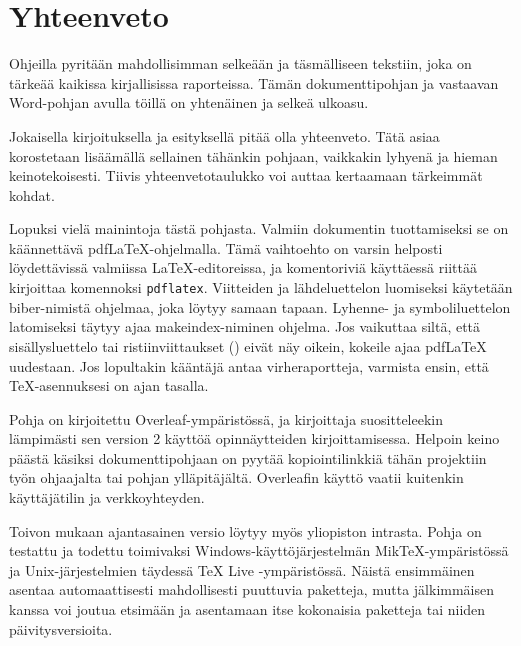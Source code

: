 \chapter{Yhteenveto}
\label{ch:yhteenveto}

Ohjeilla pyritään mahdollisimman selkeään ja täsmälliseen tekstiin, joka on tärkeää kaikissa kirjallisissa raporteissa. Tämän dokumenttipohjan ja vastaavan Word-pohjan avulla töillä on yhtenäinen ja selkeä ulkoasu.

Jokaisella kirjoituksella ja esityksellä pitää olla yhteenveto. Tätä asiaa korostetaan lisäämällä sellainen tähänkin pohjaan, vaikkakin lyhyenä ja hieman keinotekoisesti. Tiivis yhteenvetotaulukko voi auttaa kertaamaan tärkeimmät kohdat.

Lopuksi vielä mainintoja tästä pohjasta. Valmiin dokumentin tuottamiseksi se on käännettävä pdf\LaTeX{}-ohjelmalla. Tämä vaihtoehto on varsin helposti löydettävissä valmiissa \LaTeX{}-editoreissa, ja komentoriviä käyttäessä riittää kirjoittaa komennoksi \texttt{pdflatex}. Viitteiden ja lähdeluettelon luomiseksi käytetään biber-nimistä ohjelmaa, joka löytyy samaan tapaan. Lyhenne- ja symboliluettelon latomiseksi täytyy ajaa makeindex-niminen ohjelma. Jos vaikuttaa siltä, että sisällysluettelo tai ristiinviittaukset () eivät näy oikein, kokeile ajaa pdf\LaTeX{} uudestaan. Jos lopultakin kääntäjä antaa virheraportteja, varmista ensin, että \TeX{}-asennuksesi on ajan tasalla.

Pohja on kirjoitettu Overleaf-ympäristössä, ja kirjoittaja suositteleekin lämpimästi sen version 2 käyttöä opinnäytteiden kirjoittamisessa. Helpoin keino päästä käsiksi dokumenttipohjaan on pyytää kopiointilinkkiä tähän projektiin työn ohjaajalta tai pohjan ylläpitäjältä. Overleafin käyttö vaatii kuitenkin käyttäjätilin ja verkkoyhteyden.

Toivon mukaan ajantasainen versio löytyy myös yliopiston intrasta. Pohja on testattu ja todettu toimivaksi Windows-käyttöjärjestelmän Mik\TeX-ympäristössä ja Unix-järjestelmien täydessä \TeX{} Live -ympäristössä. Näistä ensimmäinen asentaa automaattisesti mahdollisesti puuttuvia paketteja, mutta jälkimmäisen kanssa voi joutua etsimään ja asentamaan itse kokonaisia paketteja tai niiden päivitysversioita.
